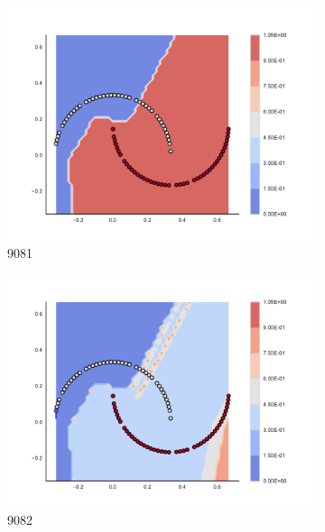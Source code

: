 \begin{figure}[h]
\begin{subfigure}[b]{0.09\textwidth}
    \includegraphics[clip, trim=2.35cm 1.75cm 4.5cm 0cm,width=\textwidth]{img/convergence/9081.pdf}
    \caption{9081}
    \label{fig:convergence_9081}
\end{subfigure}
%
\begin{subfigure}[b]{0.09\textwidth}
    \includegraphics[clip, trim=2.35cm 1.75cm 4.5cm 0cm,width=\textwidth]{img/convergence/9082.pdf}
    \caption{9082}
    \label{fig:convergence_9082}
\end{subfigure}
%
\begin{subfigure}[b]{0.09\textwidth}

\end{subfigure}
\end{figure}
